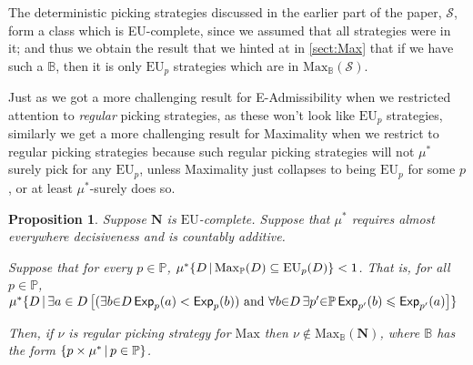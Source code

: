 \documentclass[a4paper]{article}
\newtheorem{proposition}[theorem]{Proposition}
\newcommand\N{\mathbf{N}}
\renewcommand\S{\mathcal{S}}
\newcommand\s{\mathsf{s}}
\renewcommand\P{\mathbb{P}} %
\newcommand\Exp{\mathsf{Exp}}
\newcommand\EU{\mathrm{EU}}
\newcommand\U{\mathfrak{U}} %
\newcommand\Maximality{\mathrm{Max}}
\newcommand{\IB}{\mathbb{B}}
\newcommand{\IP}{\P}
\newcommand{\todoinfo}[2][]{\todo[backgroundcolor=orange!80,bordercolor=black,linecolor=gray!80, #1,inline,caption={}]{#2}}
\renewcommand{\color}[1]{}
\newcommand\SetDelimiter[1][]{
	\nonscript\,#1\vert \allowbreak \nonscript\,\mathopen{}}
\providecommand\given{\SetDelimiter}
\renewcommand{\leq}{\leqslant}
\newenvironment{CCM rewritten}
{\begingroup\color{blue}} %
{\endgroup}              %
\begin{document}

The deterministic picking strategies discussed in the earlier part of the paper, $\S$, form a class which is EU-complete, since we assumed that all strategies were in it; and thus we obtain the result that we hinted at in \cref{sect:Max} that if we have such a $\IB$, then it is only $\EU_p$ strategies which are in $\Maximality_\IB(\S)$.



{\color{violet}Just as we got a more challenging result for E-Admissibility when we restricted attention to \emph{regular} picking strategies, as these won't look like $\EU_p$ strategies, similarly we get a more challenging result for Maximality when we restrict to regular picking strategies because such regular picking strategies will not $\mu^*$ surely pick for any $\EU_p$, unless Maximality just collapses to being $\EU_p$ for some $p$, or at least $\mu^*$-surely does so.}

\begin{proposition}\label{thm:max-nu-reg-nec}
	Suppose $\N$ is $\EU$-complete.  
	Suppose that $\mu^*$ requires almost everywhere decisiveness and is countably additive.

	Suppose that for every $p\in\IP$, $\mu^*\{D\given \Maximality_\IP(D)\subseteq\EU_p(D)\}< 1$. That is, for all $p\in \IP$, $\mu^*\{D\given \exists a\in D\left[(\exists b{\in} D \, \Exp_{p}(a)<\Exp_{p}(b))\text{ and }\forall b{\in} D\, \exists p'{\in}\IP \,\Exp_{p'}(b)\leq \Exp_{p'}(a)\right]\}$
	
	Then, if $\nu$ is regular picking strategy for $\Maximality$ then $\nu\notin \Maximality_\IB(\N)$, where 	$\IB$ has the form $\{p\times \mu^*\given p\in \IP\}$. 
\end{proposition}
\end{document}
